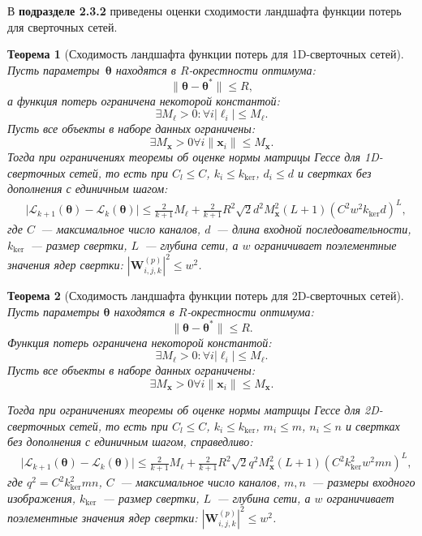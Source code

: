 \documentclass{dissert}
\newtheorem{theorem}{Теорема}
\begin{document}
В \textbf{подразделе 2.3.2} приведены оценки сходимости ландшафта функции потерь для сверточных сетей.

\begin{theorem}[Сходимость ландшафта функции потерь для 1D-сверточных сетей]
Пусть параметры~$\boldsymbol{\theta}$ находятся в $R$-окрестности оптимума:
\[
    \|\boldsymbol{\theta} - \boldsymbol{\theta}^*\| \leqslant R,
\]
а функция потерь ограничена некоторой константой:
\[
    \exists  M_{\ell} > 0:  \forall i |\ell_i| \leqslant M_{\ell}.
\]
Пусть все объекты в наборе данных ограничены:
\[
    \exists M_{\mathbf{x}} > 0 \forall i  \|\mathbf{x}_i\| \leqslant M_{\mathbf{x}}.
\]
Тогда при ограничениях теоремы об оценке нормы матрицы Гессе для 1D-сверточных сетей, то есть при $C_l \leqslant C$, $k_i \leqslant k_{\mathrm{ker}}$, $d_i \leqslant d$ и свертках без дополнения с единичным шагом:
\begin{align}
    & \big|\mathcal{L}_{k+1}(\boldsymbol{\theta}) - \mathcal{L}_{k}(\boldsymbol{\theta})\big| \leqslant \frac{2}{k+1}M_{\ell} + \frac{2}{k+1}R^2\sqrt{2}d^2M_{\mathbf{x}}^2(L+1)(C^2w^2k_{\mathrm{ker}}d)^L,
\end{align}
где $C$~--- максимальное число каналов, $d$~--- длина входной последовательности, $k_{\mathrm{ker}}$~--- размер свертки, $L$~--- глубина сети, а $w$ ограничивает поэлементные значения ядер свертки: $|\mathbf{W}^{(p)}_{i,j,k}|^2\le w^2$.
\end{theorem}

\begin{theorem}[Сходимость ландшафта функции потерь для 2D-сверточных сетей]
Пусть параметры $\boldsymbol{\theta}$ находятся в $R$-окрестности оптимума:
\[
    \|\boldsymbol{\theta} - \boldsymbol{\theta}^*\| \leqslant R.
\]
Функция потерь ограничена некоторой константой:
\[
    \exists  M_{\ell} > 0:  \forall i |\ell_i| \leqslant M_{\ell}.
\]
Пусть все объекты в наборе данных ограничены:
\[
    \exists M_{\mathbf{x}} > 0 \forall i  \|\mathbf{x}_i\| \leqslant M_{\mathbf{x}}.
\]

Тогда при ограничениях теоремы об оценке нормы матрицы Гессе для 2D-сверточных сетей, то есть при $C_l \leqslant C$, $k_i \leqslant k_{\mathrm{ker}}$, $m_i \leqslant m$, $n_i \leqslant n$ и свертках без дополнения с единичным шагом, справедливо:
\begin{align}
    & \big|\mathcal{L}_{k+1}(\boldsymbol{\theta}) - \mathcal{L}_{k}(\boldsymbol{\theta})\big| \leqslant \frac{2}{k+1}M_{\ell} + \frac{2}{k+1}R^2\sqrt{2}q^2M_{\mathbf{x}}^2(L+1)(C^2k_{\mathrm{ker}}^2w^2mn)^L,
\end{align}
где $q^2 = C^2k_{\mathrm{ker}}^2mn$, $C$~--- максимальное число каналов, $m,n$~--- размеры входного изображения, $k_{\mathrm{ker}}$~--- размер свертки, $L$~--- глубина сети, а $w$ ограничивает поэлементные значения ядер свертки: $|\mathbf{W}^{(p)}_{i,j,k}|^2\le w^2$.
\end{theorem}
\end{document}
